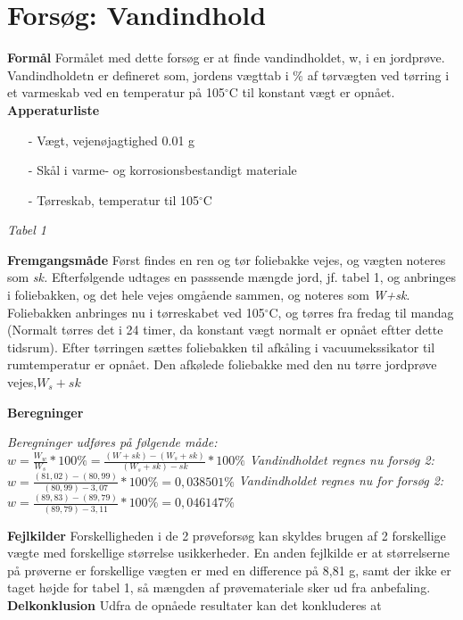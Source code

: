 \chapter{Forsøg: Vandindhold}

\textbf{Formål}
\newline
Formålet med dette forsøg er at finde vandindholdet, w, i en jordprøve. Vandindholdetn er defineret som, jordens vægttab i \% af tørvægten ved tørring i et varmeskab ved en temperatur på 105$^{\circ}$C til konstant vægt er opnået.
\newline
\newline
\textbf{Apperaturliste}
\begin{itemize}
\item[-] Vægt, vejenøjagtighed 0.01 g
\item[-] Skål i varme- og korrosionsbestandigt materiale
\item[-] Tørreskab, temperatur til 105$^{\circ}$C
\end{itemize}

\textit{Tabel 1}


\textbf{Fremgangsmåde}
\newline
Først findes en ren og tør foliebakke vejes, og vægten noteres som \textit{sk.} Efterfølgende udtages en passsende mængde jord, jf. tabel 1, og anbringes i foliebakken, og det hele vejes omgående sammen, og noteres som \textit{W+sk}.
\newline
Foliebakken anbringes nu i tørreskabet ved 105$^{\circ}$C, og tørres fra fredag til mandag (Normalt tørres det i 24 timer, da konstant vægt normalt er opnået eftter dette tidsrum). Efter tørringen sættes foliebakken til afkåling i vacuumekssikator til rumtemperatur er opnået. Den afkølede foliebakke med den nu tørre jordprøve vejes,\textit{$W_{s}+sk$}
\newline
\newline

\textbf{Beregninger}
\begin{center}
\textit{Beregninger udføres på følgende måde:}
\newline
$w=\frac{W_w}{W_s}*100\%=\frac{(W+sk)-(W_s+sk)}{(W_s+sk)-sk}*100\%$
\newline
\textit{Vandindholdet regnes nu forsøg 2:}
$w=\frac{(81,02)-(80,99)}{(80,99)-3,07}*100\%=0,038501\%$
\newline
\textit{Vandindholdet regnes nu for forsøg 2:}
\newline
$w=\frac{(89,83)-(89,79)}{(89,79)-3,11}*100\%=0,046147\%$
\end{center}

\textbf{Fejlkilder}
\newline
Forskelligheden i de 2 prøveforsøg kan skyldes brugen af 2 forskellige vægte med forskellige størrelse usikkerheder. En anden fejlkilde er at størrelserne på prøverne er forskellige vægten er med en difference på 8,81 g, samt der ikke er taget højde for tabel 1, så mængden af prøvemateriale sker ud fra anbefaling.
\newline
\newline
\textbf{Delkonklusion}
\newline
Udfra de opnåede resultater kan det konkluderes at 

